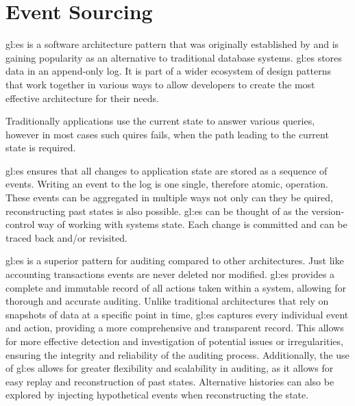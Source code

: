 %
\chapter{Event Sourcing}\label{chap:es}

\gls{gl:es} is a software architecture pattern that was originally established by \citep{fowleres} and is gaining popularity as an alternative to traditional database systems. \gls{gl:es} stores data in an append-only log. It is part of a wider ecosystem of design patterns that work together in various ways to allow developers to create the most effective architecture for their needs. 

Traditionally applications use the current state to answer various queries, however in most cases such quires fails, when the path leading to the current state is required.

\gls{gl:es} ensures that all changes to application state are stored as a sequence of events. Writing an event to the log is one single, therefore atomic, operation. These events can be aggregated in multiple ways not only can they be quired, reconstructing past states is also possible. \gls{gl:es} can be thought of as the version-control way of working with systems state. Each change is committed and can be traced back and/or revisited.

\gls{gl:es} is a superior pattern for auditing compared to other architectures. Just like accounting transactions events are never deleted nor modified. \gls{gl:es} provides a complete and immutable record of all actions taken within a system, allowing for thorough and accurate auditing. Unlike traditional architectures that rely on snapshots of data at a specific point in time, \gls{gl:es} captures every individual event and action, providing a more comprehensive and transparent record. This allows for more effective detection and investigation of potential issues or irregularities, ensuring the integrity and reliability of the auditing process. Additionally, the use of \gls{gl:es} allows for greater flexibility and scalability in auditing, as it allows for easy replay and reconstruction of past states. Alternative histories can also be explored by injecting hypothetical events when reconstructing the state.



